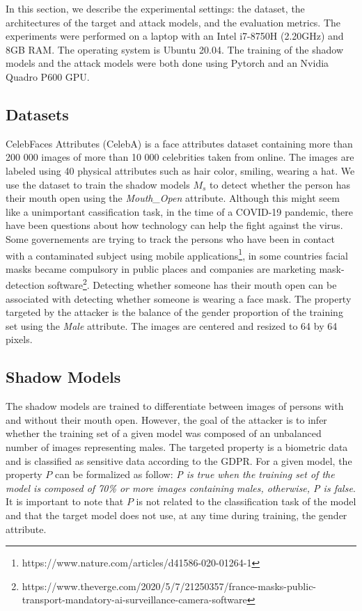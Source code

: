 \documentclass[11pt]{article}
\begin{document}
In this section, we describe the experimental settings: the dataset, the architectures of the target and attack models, and the evaluation metrics. The experiments were performed on a laptop with an Intel i7-8750H (2.20GHz) and 8GB RAM. The operating system is Ubuntu 20.04. The training of the shadow models and the attack models were both done using Pytorch and an Nvidia Quadro P600 GPU.\\

\subsection{Datasets}

CelebFaces Attributes (CelebA) \cite{liu2015faceattributes} is a face attributes dataset containing more than 200 000 images of more than 10 000 celebrities taken from online. The images are labeled using 40 physical attributes such as hair color, smiling, wearing a hat. We use the dataset to train the shadow models $M_s$ to detect whether the person has their mouth open using the \textit{Mouth\_Open} attribute. Although this might seem like a unimportant cassification task, in the time of a COVID-19 pandemic, there have been questions about how technology can help the fight against the virus. Some governements are trying to track the persons who have been in contact with a contaminated subject using mobile applications\footnote{https://www.nature.com/articles/d41586-020-01264-1}, in some countries facial masks became compulsory in public places and companies are marketing mask-detection software\footnote{https://www.theverge.com/2020/5/7/21250357/france-masks-public-transport-mandatory-ai-surveillance-camera-software}. Detecting whether someone has their mouth open can be associated with detecting whether someone is wearing a face mask. The property targeted by the attacker is the balance of the gender proportion of the training set using the \textit{Male} attribute. The images are centered and resized to 64 by 64 pixels.\\

\subsection{Shadow Models}
The shadow models are trained to differentiate between images of persons with and without their mouth open.
However, the goal of the attacker is to infer whether the training set of a given model was composed of an unbalanced number of images representing males. The targeted property is a biometric data and is classified as sensitive data according to the GDPR. For a given model, the property $P$ can be formalized as follow: \textit{P is true when the training set of the model is composed of 70\% or more images containing males, otherwise, P is false}. It is important to note that $P$ is not related to the classification task of the model and that the target model does not use, at any time during training, the gender attribute.\\
\end{document}
